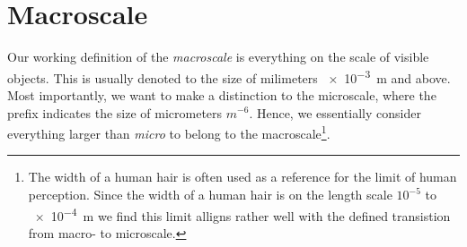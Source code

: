 
















\section{Macroscale}\label{sec:macroscale}
Our working definition of the \textit{macroscale} is everything on the scale of visible objects. This is usually denoted to the size of milimeters \SI{e-3}{\metre} and above. Most importantly, we want to make a distinction to the microscale, where the prefix indicates the size of micrometers $m^{-6}$. Hence, we essentially consider everything larger than \textit{micro} to belong to the macroscale\footnote{The width of a human hair is often used as a reference for the limit of human perception. Since the width of a human hair is on the length scale $10^{-5}$ to \SI{e-4}{m} we find this limit alligns rather well with the defined transistion from macro- to microscale.}.

